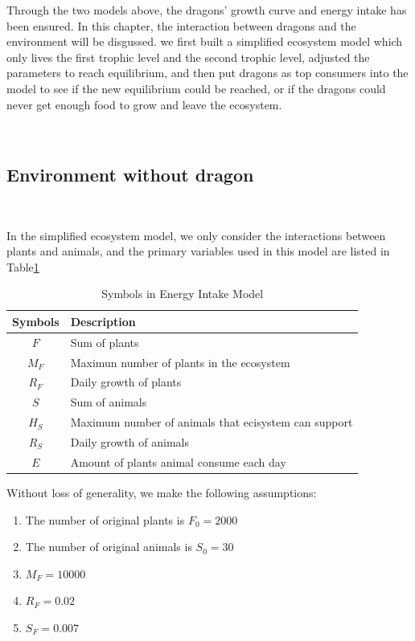\documentclass{mcmthesis}
\begin{document}
Through the two models above, the dragons' growth curve and energy intake has been ensured. In this chapter,
the interaction between dragons and the environment will be disgussed. 
we first built a simplified ecosystem model which only lives the first trophic level and the second trophic level, 
adjusted the parameters to reach equilibrium, and then put dragons as top consumers into the model to see 
if the new equilibrium could be reached, or if the dragons could never get enough food to grow and leave the ecosystem.

~\ \
\subsection{Environment without dragon}
~\ \

In the simplified ecosystem model, we only consider the interactions between plants and animals,
and the primary variables used in this model are listed in Table\ref{tb:Variables3}

\begin{table}[h]
\centering
\caption{Symbols in Energy Intake Model}
\begin{tabular}{cl}
\toprule
\textbf{Symbols}   & \textbf{Description}                                 \\
\midrule
$F$                & Sum of plants                                        \\
$M_{F}$            & Maximun number of plants in the ecosystem            \\
$R_{F}$            & Daily growth of plants                               \\
$S$                & Sum of animals                                       \\
$H_{S}$            & Maximum number of animals that ecisystem can support \\
$R_{S}$            & Daily growth of animals                              \\
$E$                & Amount of plants animal consume each day             \\
\bottomrule
\end{tabular}\label{tb:Variables3}
\end{table}

Without loss of generality, we make the following assumptions:
\begin{enumerate}
    \item The number of original plants is $F_{0}=2000$
    \item The number of original animals is $S_{0}=30$
    \item $M_{F}=10000$
    \item $R_{F}=0.02$
    \item $S_{F}=0.007$
\end{enumerate}
\end{document}
